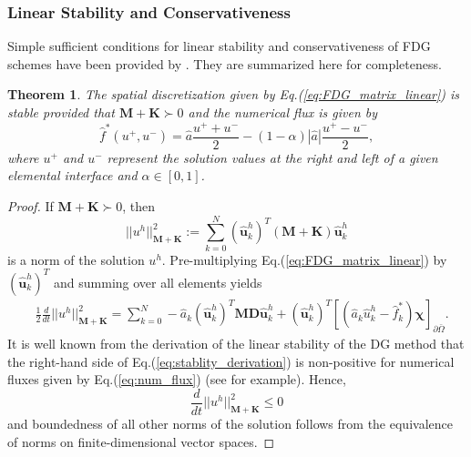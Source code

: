 \documentclass[preprint,12pt]{elsarticle}
\newtheorem{theorem}{Theorem}
\begin{document}
\subsubsection{Linear Stability and Conservativeness}
\label{sec:FDG_theo}
Simple sufficient conditions for linear stability and conservativeness of FDG schemes have been provided by \cite{allaneau2011connections}. They are summarized here for completeness.
\begin{theorem}
\label{theo:FDG_stability}
    The spatial discretization given by Eq.(\ref{eq:FDG_matrix_linear}) is stable provided that $\mathbf{M} + \mathbf{K} \succ 0$ and the numerical flux is given by
    \begin{equation}
        \hat{f}^*(u^{+},u^{-}) = \hat{a} \frac{u^{+}+u^{-}}{2} - (1-\alpha)|\hat{a}| \frac{u^{+}-u^{-}}{2},
        \label{eq:num_flux}
    \end{equation}
    where $u^+$ and $u^-$ represent the solution values at the right and left of a given elemental interface and $\alpha \in [0,1]$. 
\end{theorem}
\begin{proof}
    If $\mathbf{M} + \mathbf{K} \succ 0$, then
    \begin{equation}
        ||u^h||_{\mathbf{M}+\mathbf{K}}^2 :=
        \sum_{k=0}^N
        (\hat{\mathbf{u}}_k^h)^T(\mathbf{M}+\mathbf{K}) \hat{\mathbf{u}}_k^h
    \end{equation}
    is a norm of the solution $u^h$. Pre-multiplying Eq.(\ref{eq:FDG_matrix_linear}) by $(\hat{\mathbf{u}}_k^h)^T$ and summing over all elements yields
    \begin{align}
    &\frac{1}{2} \frac{d}{dt} ||u^h||_{\mathbf{M}+\mathbf{K}}^2
    = \sum_{k=0}^N-\hat{a}_k(\hat{\mathbf{u}}_k^h)^T\mathbf{M} \mathbf{D} \hat{\mathbf{u}}_k^h
    + (\hat{\mathbf{u}}_k^h)^T\left[(\hat{a}_k\hat{u}^h_k - \hat{f}_k^{*})\bm{\chi}\right]_{\partial \bar{\Omega}}.
    \label{eq:stablity_derivation}
    \end{align}
    It is well known from the derivation of the linear stability of the DG method that the right-hand side of Eq.(\ref{eq:stablity_derivation}) is non-positive for numerical fluxes given by Eq.(\ref{eq:num_flux}) (see \cite{hesthaven2007nodal, allaneau2011connections} for example). Hence,
    \begin{equation}
        \frac{d}{dt}||u^h||_{\mathbf{M}+\mathbf{K}}^2 \leq 0
    \end{equation}
    and boundedness of all other norms of the solution follows from the equivalence of norms on finite-dimensional vector spaces.
\end{proof}
\end{document}
